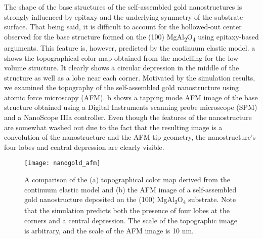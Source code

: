 The shape of the base structures of the self-assembled gold
nanostructures is strongly influenced by epitaxy and the underlying symmetry of the substrate surface. That being
said, it is difficult to account for the hollowed-out center
observed for the base structure formed on the (100) MgAl\textsubscript{2}O\textsubscript{4}
using epitaxy-based arguments. This feature is, however,
predicted by the continuum elastic model. a shows
the topographical color map obtained from the modelling for
the low-volume structure. It clearly shows a circular depression in the middle of the structure as well as a lobe near
each corner. Motivated by the simulation results, we
examined the topography of the self-assembled gold nanostructure using atomic force microscopy (AFM). b
shows a tapping mode AFM image of the base structure
obtained using a Digital Instruments scanning probe microscope (SPM) and a NanoScope IIIa controller. Even though
the features of the nanostructure are somewhat washed out
due to the fact that the resulting image is a convolution of
the nanostructure and the AFM tip geometry, the nanostructure's four lobes and central depression are clearly visible.
\begin{figure}
    \centering
    \texttt{[image: nanogold\_afm]}
    \caption{\label{fig:nanogold_afm}A comparison of the (a) topographical color map derived
        from the continuum elastic model and (b) the AFM image of a
        self-assembled gold nanostructure deposited on the (100) MgAl\textsubscript{2}O\textsubscript{4}
        substrate. Note that the simulation predicts both the presence of
        four lobes at the corners and a central depression. The scale of the
        topographic image is arbitrary, and the scale of the AFM image is
        10 nm.}
\end{figure}

